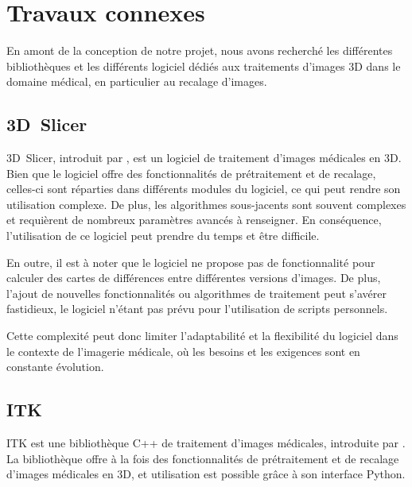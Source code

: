 \documentclass{article}
\begin{document}
{
    \section{Travaux connexes}
    \label{sec:related-work}

    En amont de la conception de notre projet, nous avons recherché les différentes bibliothèques et les différents logiciel dédiés aux traitements d'images 3D dans le domaine médical, en particulier au recalage d'images.

    {
        \bigskip
        \subsection{3D~Slicer}
        \label{subsec:3d-slicer-related-work}

        3D~Slicer, introduit par \cite{slicer}, est un logiciel de traitement d'images médicales en 3D. Bien que le logiciel offre des fonctionnalités de prétraitement et de recalage, celles-ci sont réparties dans différents modules du logiciel, ce qui peut rendre son utilisation complexe. De plus, les algorithmes sous-jacents sont souvent complexes et requièrent de nombreux paramètres avancés à renseigner. En conséquence, l'utilisation de ce logiciel peut prendre du temps et être difficile.

        \bigskip

        En outre, il est à noter que le logiciel ne propose pas de fonctionnalité pour calculer des cartes de différences entre différentes versions d'images. De plus, l'ajout de nouvelles fonctionnalités ou algorithmes de traitement peut s'avérer fastidieux, le logiciel n'étant pas prévu pour l'utilisation de scripts personnels.

        \bigskip

        Cette complexité peut donc limiter l'adaptabilité et la flexibilité du logiciel dans le contexte de l'imagerie médicale, où les besoins et les exigences sont en constante évolution.
    }

    {
        \bigskip
        \subsection{ITK}
        \label{subsec:itk-related-work}

        ITK est une bibliothèque C++ de traitement d'images médicales, introduite par \cite{itk}. La bibliothèque offre à la fois des fonctionnalités de prétraitement et de recalage d'images médicales en 3D, et utilisation est possible grâce à son interface Python.

}}
\end{document}
